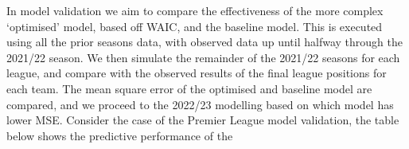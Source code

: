 \documentclass[
]{article}
\begin{document}
In model validation we aim to compare the effectiveness of the more
complex `optimised' model, based off WAIC, and the baseline model. This
is executed using all the prior seasons data, with observed data up
until halfway through the 2021/22 season. We then simulate the remainder
of the 2021/22 seasons for each league, and compare with the observed
results of the final league positions for each team. The mean square
error of the optimised and baseline model are compared, and we proceed
to the 2022/23 modelling based on which model has lower MSE. Consider
the case of the Premier League model validation, the table below shows
the predictive performance of the

\begin{table}[!h]

\caption{\label{tab:unnamed-chunk-11}Comparing Baseline and Optimised models Performance vs Obesrved}
\centering
{}
\end{table}
\end{document}
